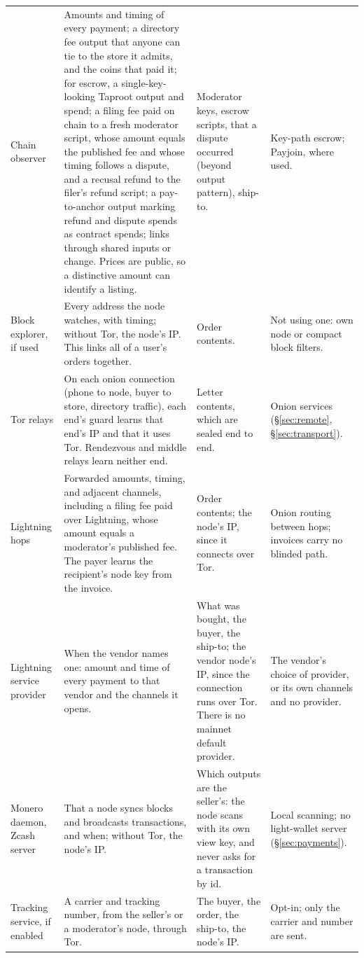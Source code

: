 {\begin{longtable}{@{}p{}p{}p{}p{}@{}}
Chain observer & Amounts and timing of every payment; a directory fee output that anyone can tie to the store it admits, and the coins that paid it; for escrow, a single-key-looking Taproot output and spend; a filing fee paid on chain to a fresh moderator script, whose amount equals the published fee and whose timing follows a dispute, and a recusal refund to the filer's refund script; a pay-to-anchor output marking refund and dispute spends as contract spends; links through shared inputs or change. Prices are public, so a distinctive amount can identify a listing. & Moderator keys, escrow scripts, that a dispute occurred (beyond output pattern), ship-to. & Key-path escrow; Payjoin, where used. \\
Block explorer, if used & Every address the node watches, with timing; without Tor, the node's IP. This links all of a user's orders together. & Order contents. & Not using one: own node or compact block filters. \\
Tor relays & On each onion connection (phone to node, buyer to store, directory traffic), each end's guard learns that end's IP and that it uses Tor. Rendezvous and middle relays learn neither end. & Letter contents, which are sealed end to end. & Onion services (\S\ref{sec:remote}, \S\ref{sec:transport}). \\
Lightning hops & Forwarded amounts, timing, and adjacent channels, including a filing fee paid over Lightning, whose amount equals a moderator's published fee. The payer learns the recipient's node key from the invoice. & Order contents; the node's IP, since it connects over Tor. & Onion routing between hops; invoices carry no blinded path. \\
Lightning service provider & When the vendor names one: amount and time of every payment to that vendor and the channels it opens. & What was bought, the buyer, the ship-to; the vendor node's IP, since the connection runs over Tor. There is no mainnet default provider. & The vendor's choice of provider, or its own channels and no provider. \\
Monero daemon, Zcash server & That a node syncs blocks and broadcasts transactions, and when; without Tor, the node's IP. & Which outputs are the seller's: the node scans with its own view key, and never asks for a transaction by id. & Local scanning; no light-wallet server (\S\ref{sec:payments}). \\
Tracking service, if enabled & A carrier and tracking number, from the seller's or a moderator's node, through Tor. & The buyer, the order, the ship-to, the node's IP. & Opt-in; only the carrier and number are sent. \\

\end{longtable}}
